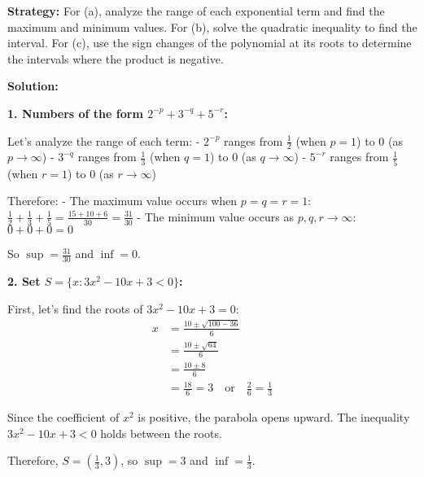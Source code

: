 \noindent\textbf{Strategy:} For (a), analyze the range of each exponential term and find the maximum and minimum values. For (b), solve the quadratic inequality to find the interval. For (c), use the sign changes of the polynomial at its roots to determine the intervals where the product is negative.

\bigskip\noindent\textbf{Solution:}

\textbf{1. Numbers of the form $2^{-p} + 3^{-q} + 5^{-r}$:}

Let's analyze the range of each term:
- $2^{-p}$ ranges from $\frac{1}{2}$ (when $p = 1$) to $0$ (as $p \to \infty$)
- $3^{-q}$ ranges from $\frac{1}{3}$ (when $q = 1$) to $0$ (as $q \to \infty$)
- $5^{-r}$ ranges from $\frac{1}{5}$ (when $r = 1$) to $0$ (as $r \to \infty$)

Therefore:
- The maximum value occurs when $p = q = r = 1$: $\frac{1}{2} + \frac{1}{3} + \frac{1}{5} = \frac{15 + 10 + 6}{30} = \frac{31}{30}$
- The minimum value occurs as $p, q, r \to \infty$: $0 + 0 + 0 = 0$

So $\sup = \textbf{$\frac{31}{30}$}$ and $\inf = \textbf{$0$}$.

\textbf{2. Set $S = \{x : 3x^2 - 10x + 3 < 0\}$:}

First, let's find the roots of $3x^2 - 10x + 3 = 0$:
\begin{align*}
x &= \frac{10 \pm \sqrt{100 - 36}}{6} \\
&= \frac{10 \pm \sqrt{64}}{6} \\
&= \frac{10 \pm 8}{6} \\
&= \frac{18}{6} = 3 \quad \text{or} \quad \frac{2}{6} = \frac{1}{3}
\end{align*}

Since the coefficient of $x^2$ is positive, the parabola opens upward. The inequality $3x^2 - 10x + 3 < 0$ holds between the roots.

Therefore, $S = (\frac{1}{3}, 3)$, so $\sup = \textbf{$3$}$ and $\inf = \textbf{$\frac{1}{3}$}$.

